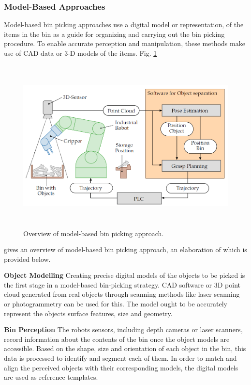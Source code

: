 \subsubsection{Model-Based Approaches}
Model-based  bin picking approaches use a digital model or representation, of the items in the bin as a guide for organizing and carrying out the bin picking procedure. To enable accurate perception and manipulation, these methods make use of \ac{CAD} data or 3-D models of the items. Fig. \ref{fig:model_based} 
\begin{figure}[t]
  \centering
  \includegraphics[width=400pt,height=250pt]{pictures/model_based.PNG}
  \caption{Overview of model-based bin picking approach.\cite{spenrath2022heuristic}}
  \label{fig:model_based}
\end{figure}
gives an overview of model-based bin picking approach, an elaboration of which is provided below.

\vspace{5mm}

\textbf{Object Modelling} Creating precise digital models of the objects to be picked is the first stage in a model-based bin-picking strategy. \ac{CAD} software or 3D point cloud generated from real objects through scanning methods like laser scanning or photogrammetry can be used for this. The model ought to be accurately represent the objects surface features, size and geometry.\cite{lin2020robotic}

\vspace{5mm}

\textbf{Bin Perception} The robots sensors, including depth cameras or laser scanners, record information about the contents of the bin once the object models are accessible. Based on the shape, size and orientation of each object in the bin, this data is processed to identify and segment each of them. In order to match and align the perceived objects with their corresponding models, the digital models are used as reference templates.\cite{lin2020robotic}

